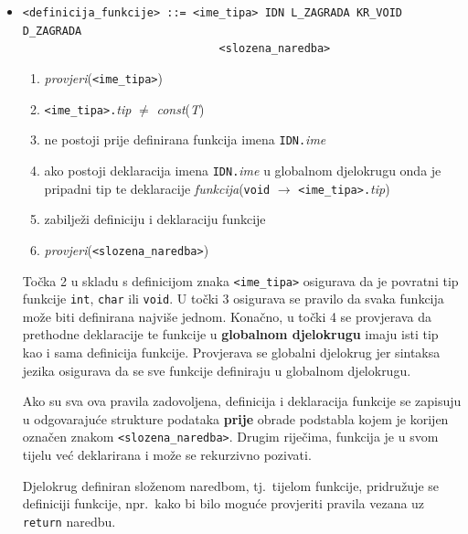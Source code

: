 \documentclass[times, 12pt, utf8]{book}
\begin{document}
\begin{itemize}

\item
\verb|<definicija_funkcije> ::= <ime_tipa> IDN L_ZAGRADA KR_VOID D_ZAGRADA|\\
\verb|                              <slozena_naredba>|
\begin{enumerate}
\item
\emph{provjeri}(\verb|<ime_tipa>|)
\item
\verb|<ime_tipa>.|\emph{tip} \(\neq\) \emph{const}(\emph{T})
\item
ne postoji prije definirana funkcija imena \verb|IDN.|\emph{ime}
\item
ako postoji deklaracija imena \verb|IDN.|\emph{ime} u globalnom djelokrugu onda je pripadni tip te deklaracije \emph{funkcija}(\verb|void| \(\to\) \verb|<ime_tipa>.|\emph{tip})
\item
zabilježi definiciju i deklaraciju funkcije
\item
\emph{provjeri}(\verb|<slozena_naredba>|)
\end{enumerate}

Točka 2 u skladu s definicijom znaka \verb|<ime_tipa>| osigurava da je povratni tip funkcije \verb|int|, \verb|char| ili \verb|void|.
U točki 3 osigurava se pravilo da svaka funkcija može biti definirana najviše jednom.
Konačno, u točki 4 se provjerava da prethodne deklaracije te funkcije u \textbf{globalnom djelokrugu} imaju isti tip kao i sama definicija funkcije.
Provjerava se globalni djelokrug jer sintaksa jezika osigurava da se sve funkcije definiraju u globalnom djelokrugu.

Ako su sva ova pravila zadovoljena, definicija i deklaracija funkcije se zapisuju u odgovarajuće strukture podataka \textbf{prije} obrade podstabla kojem je korijen označen znakom \verb|<slozena_naredba>|.
Drugim riječima, funkcija je u svom tijelu već deklarirana i može se rekurzivno pozivati.

Djelokrug definiran složenom naredbom, tj.~tijelom funkcije, pridružuje se definiciji funkcije, npr.~kako bi bilo moguće provjeriti pravila vezana uz \verb|return| naredbu.


\end{itemize}
\end{document}
